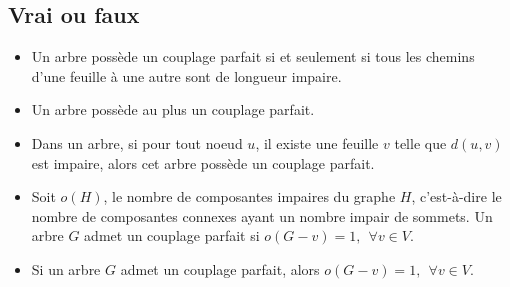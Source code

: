 \subsection{Vrai ou faux}
\begin{itemize}
  \item Un arbre possède un couplage parfait si et seulement si tous les chemins d'une feuille à une autre sont de longueur impaire.
  \item Un arbre possède au plus un couplage parfait.
  \item Dans un arbre, si pour tout noeud $u$, il existe une feuille $v$ telle que $d(u,v)$ est impaire, alors cet arbre possède un couplage parfait.
  \item Soit $o(H)$, le nombre de composantes impaires du graphe $H$, c'est-à-dire le nombre de composantes connexes ayant un nombre impair de sommets. Un arbre $G$ admet un couplage parfait si $o(G-v)=1,  \ \ \forall v \in V$.
  \item Si un arbre $G$ admet un couplage parfait, alors $o(G-v)=1, \ \ \forall v \in V$.
\end{itemize}

